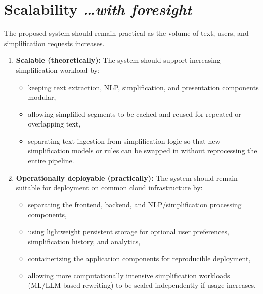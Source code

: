 \documentclass[11pt,a4paper]{article}
\newcommand{\BvrHint}[1]{%
  {\normalfont\normalsize\itshape\hfill #1}}
\begin{document}
\section{Scalability %
\BvrHint{\ldots with foresight}}
The proposed system should remain practical as the volume of text, users, and simplification requests increases.
\begin{enumerate}[leftmargin=0.7cm]
    \item \textbf{Scalable (theoretically):} The system should support increasing simplification workload by:
    
    \begin{itemize}[leftmargin=0.7cm]
        \item keeping text extraction, NLP, simplification, and presentation components modular,
        \item allowing simplified segments to be cached and reused for repeated or overlapping text,
        \item separating text ingestion from simplification logic so that new simplification models or rules can be swapped in without reprocessing the entire pipeline.
    \end{itemize}
    
    \item \textbf{Operationally deployable (practically):} The system should remain suitable for deployment on common cloud infrastructure by:
    
    \begin{itemize}[leftmargin=0.7cm]
        \item separating the frontend, backend, and NLP/simplification processing components,
        \item using lightweight persistent storage for optional user preferences, simplification history, and analytics,
        \item containerizing the application components for reproducible deployment,
        \item allowing more computationally intensive simplification workloads (ML/LLM-based rewriting) to be scaled independently if usage increases.
    \end{itemize}
\end{enumerate}
\end{document}
